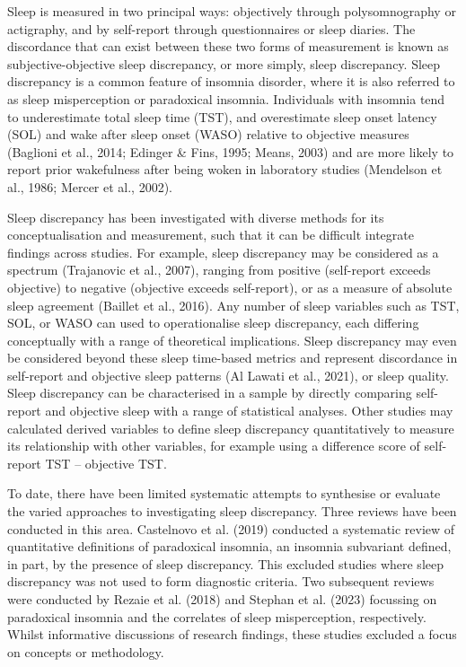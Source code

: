 \documentclass[
]{article}
\begin{document}
Sleep is measured in two principal ways: objectively through polysomnography or actigraphy, and by self-report through questionnaires or sleep diaries. The discordance that can exist between these two forms of measurement is known as subjective-objective sleep discrepancy, or more simply, sleep discrepancy. Sleep discrepancy is a common feature of insomnia disorder, where it is also referred to as sleep misperception or paradoxical insomnia. Individuals with insomnia tend to underestimate total sleep time (TST), and overestimate sleep onset latency (SOL) and wake after sleep onset (WASO) relative to objective measures (Baglioni et al., 2014; Edinger \& Fins, 1995; Means, 2003) and are more likely to report prior wakefulness after being woken in laboratory studies (Mendelson et al., 1986; Mercer et al., 2002).

Sleep discrepancy has been investigated with diverse methods for its conceptualisation and measurement, such that it can be difficult integrate findings across studies. For example, sleep discrepancy may be considered as a spectrum (Trajanovic et al., 2007), ranging from positive (self-report exceeds objective) to negative (objective exceeds self-report), or as a measure of absolute sleep agreement (Baillet et al., 2016). Any number of sleep variables such as TST, SOL, or WASO can used to operationalise sleep discrepancy, each differing conceptually with a range of theoretical implications. Sleep discrepancy may even be considered beyond these sleep time-based metrics and represent discordance in self-report and objective sleep patterns (Al Lawati et al., 2021), or sleep quality. Sleep discrepancy can be characterised in a sample by directly comparing self-report and objective sleep with a range of statistical analyses. Other studies may calculated derived variables to define sleep discrepancy quantitatively to measure its relationship with other variables, for example using a difference score of self-report TST -- objective TST.

To date, there have been limited systematic attempts to synthesise or evaluate the varied approaches to investigating sleep discrepancy. Three reviews have been conducted in this area. Castelnovo et al. (2019) conducted a systematic review of quantitative definitions of paradoxical insomnia, an insomnia subvariant defined, in part, by the presence of sleep discrepancy. This excluded studies where sleep discrepancy was not used to form diagnostic criteria. Two subsequent reviews were conducted by Rezaie et al. (2018) and Stephan et al. (2023) focussing on paradoxical insomnia and the correlates of sleep misperception, respectively. Whilst informative discussions of research findings, these studies excluded a focus on concepts or methodology.
\end{document}
